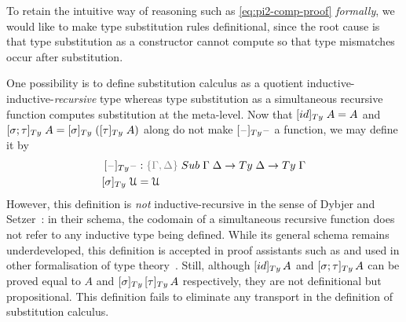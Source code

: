 \documentclass[a4paper,UKenglish,numberwithinsect,cleveref,thm-restate]{lipics-v2021}
\begin{document}
To retain the intuitive way of reasoning such as \eqref{eq:pi2-comp-proof} \emph{formally}, we would like to make type substitution rules definitional, since the root cause is that type substitution as a constructor cannot compute so that type mismatches occur after substitution.

One possibility is to define substitution calculus as a quotient inductive-inductive-\emph{recursive} type whereas type substitution as a simultaneous recursive function computes substitution at the meta-level.
Now that $[ \idS ]_{\Ty}\;A = A$ and $[ \sigma ; \tau ]_{\Ty}\;A = [ \sigma ]_{\Ty}\;([ \tau ]_{\Ty}\;A)$ along do not make $[\blank]_{\Ty}\blank$ a function, we may define it by
\begin{alignat*}{3}
[\blank]_{\Ty} \blank &: \implicit{\Gamma, \Delta} \; \Sub\;\Gamma\;\Delta \to \Ty\;\Delta \to \Ty\;\Gamma \\
[ \sigma ]_{\Ty}\;\UU & = \UU
\end{alignat*}
However, this definition is \emph{not} inductive-recursive in the sense of Dybjer and Setzer~\cite{Dybjer2000,Dybjer2003}: in their schema, the codomain of a simultaneous recursive function does not refer to any inductive type being defined.
While its general schema remains underdeveloped, this definition is accepted in proof assistants such as \Agda and used in other formalisation of type theory~\cite{Danielsson2006}.
Still, although $[\idS]_{\Ty}\,A$ and $[\sigma; \tau]_{\Ty}\,A$ can be proved equal to $A$ and $[\sigma]_{\Ty}\,[\tau]_{\Ty}\,A$ respectively, they are not definitional but propositional.
This definition fails to eliminate any transport in the definition of substitution calculus.
\end{document}
